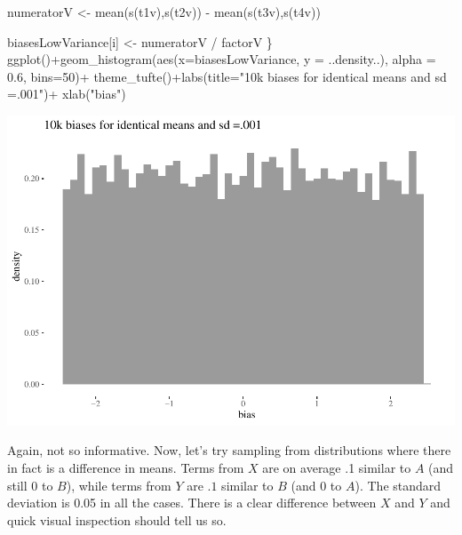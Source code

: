 \documentclass[
  10pt,
  dvipsnames,enabledeprecatedfontcommands]{scrartcl}
\newenvironment{Shaded}{\begin{snugshade}}{\end{snugshade}}
\newcommand{\AttributeTok}[1]{\textcolor[rgb]{0.77,0.63,0.00}{#1}}
\newcommand{\DecValTok}[1]{\textcolor[rgb]{0.00,0.00,0.81}{#1}}
\newcommand{\FloatTok}[1]{\textcolor[rgb]{0.00,0.00,0.81}{#1}}
\newcommand{\FunctionTok}[1]{\textcolor[rgb]{0.00,0.00,0.00}{#1}}
\newcommand{\NormalTok}[1]{#1}
\newcommand{\OtherTok}[1]{\textcolor[rgb]{0.56,0.35,0.01}{#1}}
\newcommand{\SpecialCharTok}[1]{\textcolor[rgb]{0.00,0.00,0.00}{#1}}
\newcommand{\StringTok}[1]{\textcolor[rgb]{0.31,0.60,0.02}{#1}}
\begin{document}
\begin{Shaded}
\begin{Highlighting}[]
\NormalTok{numeratorV }\OtherTok{\textless{}{-}}  \FunctionTok{mean}\NormalTok{(}\FunctionTok{s}\NormalTok{(t1v),}\FunctionTok{s}\NormalTok{(t2v)) }\SpecialCharTok{{-}} \FunctionTok{mean}\NormalTok{(}\FunctionTok{s}\NormalTok{(t3v),}\FunctionTok{s}\NormalTok{(t4v))}

\NormalTok{biasesLowVariance[i] }\OtherTok{\textless{}{-}}\NormalTok{ numeratorV }\SpecialCharTok{/}\NormalTok{ factorV}
\NormalTok{\}}
\FunctionTok{ggplot}\NormalTok{()}\SpecialCharTok{+}\FunctionTok{geom\_histogram}\NormalTok{(}\FunctionTok{aes}\NormalTok{(}\AttributeTok{x=}\NormalTok{biasesLowVariance, }\AttributeTok{y =}\NormalTok{ ..density..), }\AttributeTok{alpha =} \FloatTok{0.6}\NormalTok{, }\AttributeTok{bins=}\DecValTok{50}\NormalTok{)}\SpecialCharTok{+}
  \FunctionTok{theme\_tufte}\NormalTok{()}\SpecialCharTok{+}\FunctionTok{labs}\NormalTok{(}\AttributeTok{title=}\StringTok{"10k biases for identical means and sd =.001"}\NormalTok{)}\SpecialCharTok{+} \FunctionTok{xlab}\NormalTok{(}\StringTok{"bias"}\NormalTok{)}
\end{Highlighting}
\end{Shaded}

\begin{center}\includegraphics[width=1\linewidth]{paperDraft_files/figure-latex/unnamed-chunk-8-1} \end{center}
\normalsize

Again, not so informative. Now, let's try sampling from distributions
where there in fact is a difference in means. Terms from \(X\) are on
average .1 similar to \(A\) (and still \(0\) to \(B\)), while terms from
\(Y\) are \(.1\) similar to \(B\) (and 0 to \(A\)). The standard
deviation is 0.05 in all the cases. There is a clear difference between
\(X\) and \(Y\) and quick visual inspection should tell us so.
\end{document}
